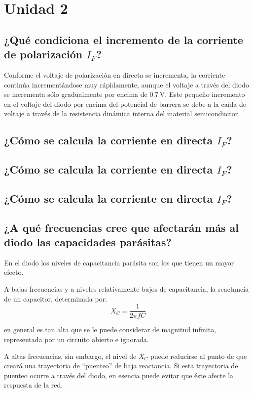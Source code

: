 \section{Unidad 2}

\subsection{¿Qué condiciona el incremento de la corriente de polarización $I_F$?}

Conforme el voltaje de polarización en directa se incrementa, la corriente continúa incrementándose muy rápidamente, aunque el voltaje a través del diodo se incrementa sólo gradualmente por encima de $0.7\,\text{V}$. Este pequeño incremento en el voltaje del diodo por encima del potencial de barrera se debe a la caída de voltaje a través de la resistencia dinámica interna del material semiconductor.

\subsection{¿Cómo se calcula la corriente en directa $I_F$?}

\subsection{¿Cómo se calcula la corriente en directa $I_F$?}

\subsection{¿Cómo se calcula la corriente en directa $I_F$?}

\subsection{¿A qué frecuencias cree que afectarán más al diodo las capacidades parásitas?}

En el diodo los niveles de capacitancia parásita son los que tienen un mayor efecto.

A bajas frecuencias y a niveles relativamente bajos de capacitancia, la reactancia de un capacitor, determinada por:
\[
X_C = \dfrac{1}{2\pi f C}
\]

en general es tan alta que se le puede considerar de magnitud infinita, representada por un circuito abierto e ignorada.

A altas frecuencias, sin embargo, el nivel de $X_C$ puede reducirse al punto de que creará una trayectoria de “puenteo” de baja reactancia. Si esta trayectoria de puenteo ocurre a través del diodo, en esencia puede evitar que éste afecte la respuesta de la red.

